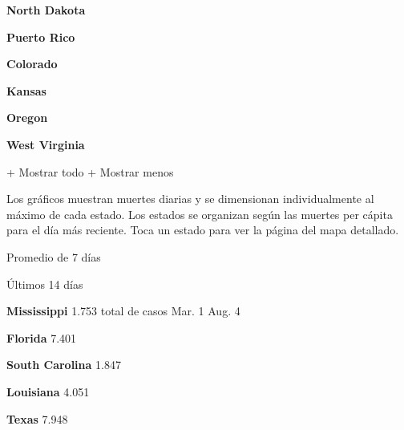 \href{https://www.nytimes.com/interactive/2020/us/north-dakota-coronavirus-cases.html}{}

\textbf{North Dakota}

\href{https://www.nytimes.com/interactive/2020/us/puerto-rico-coronavirus-cases.html}{}

\textbf{Puerto Rico}

\href{https://www.nytimes.com/interactive/2020/us/colorado-coronavirus-cases.html}{}

\textbf{Colorado}

\href{https://www.nytimes.com/interactive/2020/us/kansas-coronavirus-cases.html}{}

\textbf{Kansas}

\href{https://www.nytimes.com/interactive/2020/us/oregon-coronavirus-cases.html}{}

\textbf{Oregon}

\href{https://www.nytimes.com/interactive/2020/us/west-virginia-coronavirus-cases.html}{}

\textbf{West Virginia}

+ Mostrar todo + Mostrar menos

Los gráficos muestran muertes diarias y se dimensionan individualmente
al máximo de cada estado. Los estados se organizan según las muertes per
cápita para el día más reciente. Toca un estado para ver la página del
mapa detallado.

\href{https://www.nytimes.com/interactive/2020/us/mississippi-coronavirus-cases.html}{}

Promedio de 7 días

Últimos 14 días

\textbf{Mississippi} 1.753 total de casos Mar. 1 Aug. 4

\href{https://www.nytimes.com/interactive/2020/us/florida-coronavirus-cases.html}{}

\textbf{Florida} 7.401

\href{https://www.nytimes.com/interactive/2020/us/south-carolina-coronavirus-cases.html}{}

\textbf{South Carolina} 1.847

\href{https://www.nytimes.com/interactive/2020/us/louisiana-coronavirus-cases.html}{}

\textbf{Louisiana} 4.051

\href{https://www.nytimes.com/interactive/2020/us/texas-coronavirus-cases.html}{}

\textbf{Texas} 7.948

\href{https://www.nytimes.com/interactive/2020/us/alabama-coronavirus-cases.html}{}

